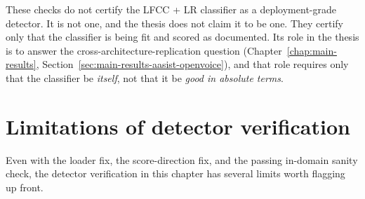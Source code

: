 These checks do not certify the LFCC + LR classifier as a
deployment-grade detector. It is not one, and the thesis does not
claim it to be one. They certify only that the classifier is being
fit and scored as documented. Its role in the thesis is to answer
the cross-architecture-replication question
(Chapter~\ref{chap:main-results}, Section~\ref{sec:main-results-aasist-openvoice}),
and that role requires only that the classifier be \emph{itself},
not that it be \emph{good in absolute terms}.


\section{Limitations of detector verification}
\label{sec:detector-verification-limitations}

Even with the loader fix, the score-direction fix, and the passing
in-domain sanity check, the detector verification in this chapter
has several limits worth flagging up front.

